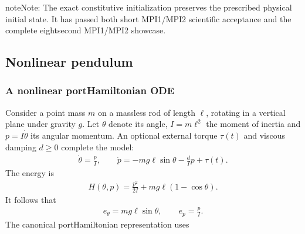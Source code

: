 \documentclass[letterpaper,10pt,english]{sphinxmanual}
\begin{document}
\begin{sphinxadmonition}{note}{Note:}
\sphinxAtStartPar
The exact constitutive initialization preserves the prescribed
physical initial state. It has passed both short MPI1/MPI2
scientific acceptance and the complete eight\sphinxhyphen{}second
MPI1/MPI2 showcase.
\end{sphinxadmonition}

\sphinxstepscope


\subsection{Nonlinear pendulum}
\label{\detokenize{examples/nonlinear_pendulum:nonlinear-pendulum}}\label{\detokenize{examples/nonlinear_pendulum::doc}}

\subsubsection{A nonlinear port\sphinxhyphen{}Hamiltonian ODE}
\label{\detokenize{examples/nonlinear_pendulum:a-nonlinear-port-hamiltonian-ode}}\label{\detokenize{examples/nonlinear_pendulum:id1}}
\sphinxAtStartPar
Consider a point mass \(m\) on a massless rod of length
\(\ell\), rotating in a vertical plane under gravity \(g\).
Let \(\theta\) denote its angle, \(I=m\ell^2\) the
moment of inertia and \(p=I\dot\theta\) its angular momentum.
An optional external torque \(\tau(t)\) and viscous damping
\(d\geq0\) complete the model:
\begin{equation*}
\begin{split}\dot\theta = \frac{p}{I},\qquad
\dot p=-mg\ell\sin\theta-\frac{d}{I}p+\tau(t).\end{split}
\end{equation*}
\sphinxAtStartPar
The energy is
\begin{equation*}
\begin{split}H(\theta,p)=\frac{p^2}{2I}
              +mg\ell(1-\cos\theta).\end{split}
\end{equation*}
\sphinxAtStartPar
It follows that
\begin{equation*}
\begin{split}e_\theta=mg\ell\sin\theta,\qquad
e_p=\frac{p}{I}.\end{split}
\end{equation*}
\sphinxAtStartPar
The canonical port\sphinxhyphen{}Hamiltonian representation uses
\end{document}

